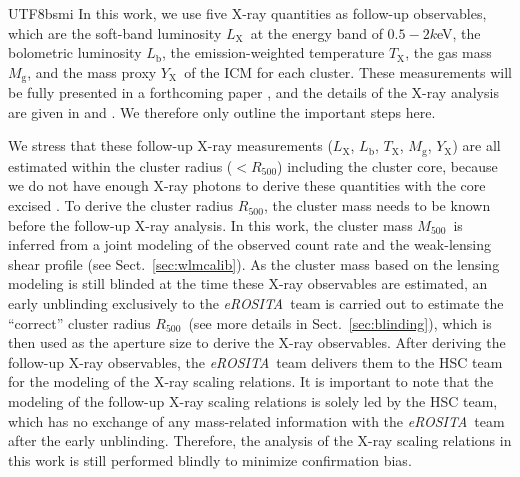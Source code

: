 \documentclass[longauth]{aa}
\newcommand{\Rfiveoo}{\ensuremath{R_{500}}}
\newcommand{\Mfiveoo}{\ensuremath{M_{500}}}
\newcommand{\eROSITA}{\emph{eROSITA}}
\newcommand{\Lx}{\ensuremath{L_{\mathrm{X}}}}
\newcommand{\Lb}{\ensuremath{L_{\mathrm{b}}}}
\newcommand{\Tx}{\ensuremath{T_{\mathrm{X}}}}
\newcommand{\Yx}{\ensuremath{Y_{\mathrm{X}}}}
\newcommand{\Mg}{\ensuremath{M_{\mathrm{g}}}}
\begin{document}
\begin{CJK*}{UTF8}{bsmi}
In this work, we use five X-ray quantities as follow-up observables, which are the soft-band luminosity \Lx\ at the energy band of $0.5-2k$eV, the bolometric luminosity \Lb, the emission-weighted temperature \Tx, the gas mass \Mg, and the mass proxy \Yx\ of the ICM for each cluster.
These measurements will be fully presented in a forthcoming paper \citep{bahar21}, and the details of the X-ray analysis are given in \cite{ghirardini21} and \cite{liu21}.
We therefore only outline the important steps here.


We stress that these follow-up X-ray measurements (\Lx, \Lb, \Tx, \Mg, \Yx) are all estimated within the cluster radius ($<\Rfiveoo$) including the cluster core, because we do not have enough X-ray photons to derive these quantities with the core excised \citep{bahar21}.
To derive the cluster radius \Rfiveoo, the cluster mass needs to be known before the follow-up X-ray analysis.
In this work, the cluster mass \Mfiveoo\ is inferred from a joint modeling of the observed count rate and the weak-lensing shear profile (see Sect.~\ref{sec:wlmcalib}).
As the cluster mass based on the lensing modeling is still blinded at the time these X-ray observables are estimated, an early unblinding exclusively to the \eROSITA\ team is carried out to estimate the ``correct'' cluster radius \Rfiveoo\ (see more details in Sect.~\ref{sec:blinding}), which is then used as the aperture size to derive the X-ray observables.
After deriving the follow-up X-ray observables, the \eROSITA\ team delivers them to the HSC team for the modeling of the X-ray scaling relations.
It is important to note that the modeling of the follow-up X-ray scaling relations is solely led by the HSC team, which has no exchange of any mass-related information with the \eROSITA\ team after the early unblinding.
Therefore, the analysis of the X-ray scaling relations in this work is still performed blindly to minimize confirmation bias.



\end{CJK*}
\end{document}
